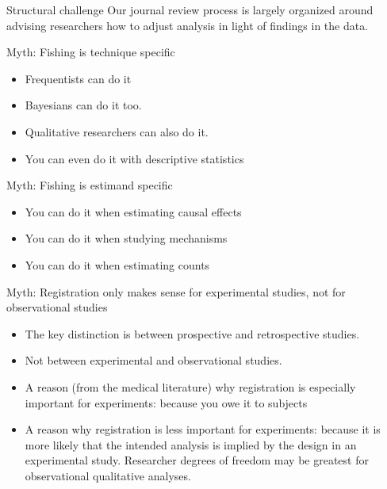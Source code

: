 \documentclass[
  11pt,
  ignorenonframetext,
]{beamer}
\providecommand{\tightlist}{%
  \setlength{\itemsep}{0pt}\setlength{\parskip}{0pt}}\usepackage{longtable,booktabs,array}
\begin{document}
\begin{frame}{Structural challenge}
\protect\hypertarget{structural-challenge}{}
Our journal review process is largely organized around advising
researchers how to adjust analysis in light of findings in the data.
\end{frame}

\begin{frame}{Myth: Fishing is technique specific}
\protect\hypertarget{myth-fishing-is-technique-specific}{}
\begin{itemize}
\item
  Frequentists can do it
\item
  Bayesians can do it too.
\item
  Qualitative researchers can also do it.
\item
  You can even do it with descriptive statistics
\end{itemize}
\end{frame}

\begin{frame}{Myth: Fishing is estimand specific}
\protect\hypertarget{myth-fishing-is-estimand-specific}{}
\begin{itemize}
\tightlist
\item
  You can do it when estimating causal effects
\item
  You can do it when studying mechanisms
\item
  You can do it when estimating counts
\end{itemize}
\end{frame}

\begin{frame}{Myth: Registration only makes sense for experimental
studies, not for observational studies}
\protect\hypertarget{myth-registration-only-makes-sense-for-experimental-studies-not-for-observational-studies}{}
\begin{itemize}
\item
  The key distinction is between prospective and retrospective studies.
\item
  Not between experimental and observational studies.
\item
  A reason (from the medical literature) why registration is especially
  important for experiments: because you owe it to subjects
\item
  A reason why registration is less important for experiments: because
  it is more likely that the intended analysis is implied by the design
  in an experimental study. Researcher degrees of freedom may be
  greatest for observational qualitative analyses.
\end{itemize}
\end{frame}
\end{document}
